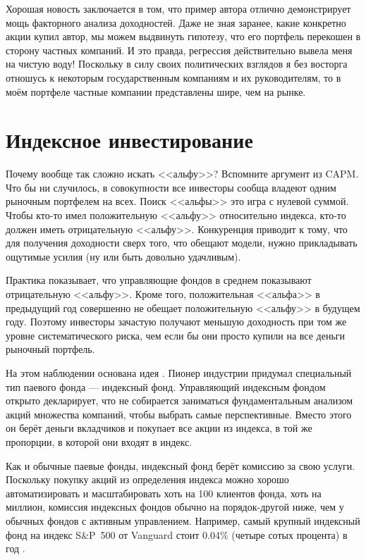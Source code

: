 Хорошая новость заключается в том, что пример автора отлично демонстрирует мощь факторного анализа доходностей. Даже не зная заранее, какие конкретно акции купил автор, мы можем выдвинуть гипотезу, что его портфель перекошен в сторону частных компаний. И это правда, регрессия действительно вывела меня на чистую воду! Поскольку в силу своих политических взглядов я без восторга отношусь к некоторым государственным компаниям и их руководителям, то в моём портфеле частные компании представлены шире, чем на рынке.

\section{Индексное инвестирование}

Почему вообще так сложно искать <<альфу>>? Вспомните аргумент из CAPM. Что бы ни случилось, в совокупности все инвесторы сообща владеют одним рыночным портфелем на всех. Поиск <<альфы>> это игра с нулевой суммой. Чтобы кто-то имел положительную <<альфу>> относительно индекса, кто-то должен иметь отрицательную <<альфу>>. Конкуренция приводит к тому, что для получения доходности сверх того, что обещают модели, нужно прикладывать ощутимые усилия (ну или быть довольно удачливым).

Практика показывает, что управляющие фондов в среднем показывают отрицательную <<альфу>>. Кроме того, положительная <<альфа>> в предыдущий год совершенно не обещает положительную <<альфу>> в будущем году. Поэтому инвесторы зачастую получают меньшую доходность при том же уровне систематического риска, чем если бы они просто купили на все деньги рыночный портфель.

На этом наблюдении основана идея . Пионер индустрии  придумал специальный тип паевого фонда --- индексный фонд. Управляющий индексным фондом открыто декларирует, что не собирается заниматься фундаментальным анализом акций множества компаний, чтобы выбрать самые перспективные. Вместо этого он берёт деньги вкладчиков и покупает все акции из индекса, в той же пропорции, в которой они входят в индекс.

Как и обычные паевые фонды, индексный фонд берёт комиссию за свою услуги. Поскольку покупку акций из определения индекса можно хорошо автоматизировать и масштабировать хоть на 100 клиентов фонда, хоть на миллион, комиссия индексных фондов обычно на порядок-другой ниже, чем у обычных фондов с активным управлением. Например, самый крупный индексный фонд на индекс S\&P~500 от Vanguard стоит 0.04\% (четыре сотых процента) в год \cite{vanguard500}.

